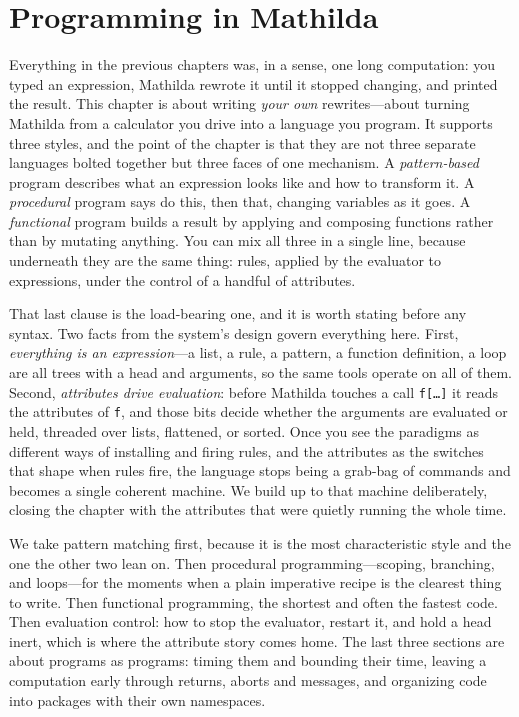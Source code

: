 \chapter{Programming in Mathilda}
\label{ch:programming}

Everything in the previous chapters was, in a sense, one long computation: you
typed an expression, Mathilda rewrote it until it stopped changing, and printed
the result. This chapter is about writing \emph{your own} rewrites---about
turning Mathilda from a calculator you drive into a language you program. It
supports three styles, and the point of the chapter is that they are not three
separate languages bolted together but three faces of one mechanism. A
\emph{pattern-based} program describes what an expression looks like and how to
transform it. A \emph{procedural} program says do this, then that, changing
variables as it goes. A \emph{functional} program builds a result by applying
and composing functions rather than by mutating anything. You can mix all three
in a single line, because underneath they are the same thing: rules, applied by
the evaluator to expressions, under the control of a handful of
attributes.

That last clause is the load-bearing one, and it is worth stating before any
syntax. Two facts from the system's design govern everything here. First,
\emph{everything is an expression}---a list, a rule,
a pattern, a function definition, a loop are all trees with a head and
arguments, so the same tools operate on all of them. Second, \emph{attributes
drive evaluation}: before Mathilda touches a call \texttt{f[\ldots]}
it reads the attributes of \texttt{f}, and those bits decide whether the
arguments are evaluated or held, threaded over lists, flattened, or sorted. Once
you see the paradigms as different ways of installing and firing rules, and the
attributes as the switches that shape when rules fire, the language stops being a
grab-bag of commands and becomes a single coherent machine. We build up to that
machine deliberately, closing the chapter with the attributes that were quietly
running the whole time.

We take pattern matching first, because it is the most characteristic style and
the one the other two lean on. Then procedural programming---scoping, branching,
and loops---for the moments when a plain imperative recipe is the clearest thing
to write. Then functional programming, the shortest and often the fastest code.
Then evaluation control: how to stop the evaluator, restart it, and hold a
head inert, which is where the attribute story comes home. The last three sections
are about programs as programs: timing them and bounding their time, leaving a
computation early through returns, aborts and messages, and organizing code into
packages with their own namespaces.

